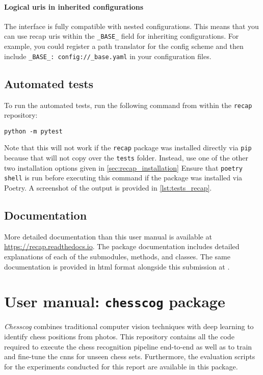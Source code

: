 \documentclass[../../report.tex]{subfiles}
\begin{document}
\subsubsection{Logical \acsp{uri} in inherited configurations}
The  interface is fully compatible with nested configurations.
This means that you can use recap \glspl{uri} within the \texttt{_BASE_} field for inheriting configurations.
For example, you could register a path translator for the config scheme and then include \texttt{_BASE_: config://_base.yaml} in your configuration files.

\section{Automated tests}
\label{sec:recap_tests}
To run the automated tests, run the following command from within the \texttt{recap} repository:
\begin{verbatim}
python -m pytest
\end{verbatim}
Note that this will not work if the \texttt{recap} package was installed directly via \texttt{pip} because that will not copy over the \texttt{tests} folder.
Instead, use one of the other two installation options given in \cref{sec:recap_installation}
Ensure that \texttt{poetry shell} is run before executing this command if the package was installed via Poetry.
A screenshot of the output is provided in \cref{lst:tests_recap}.

\section{Documentation}
\label{sec:recap_documentation}
More detailed documentation than this user manual is available at \url{https://recap.readthedocs.io}.
The package documentation includes detailed explanations of each of the submodules, methods, and classes.
The same documentation is provided in \gls{html} format alongside this submission at .

\chapter{User manual: \texttt{chesscog} package}
\label{chap:user_man_chesscog}

\emph{Chesscog} combines traditional computer vision techniques with deep learning to identify chess positions from photos.
This repository contains all the code required to execute the chess recognition pipeline end-to-end as well as to train and fine-tune the \glspl{cnn} for unseen chess sets.
Furthermore, the evaluation scripts for the experiments conducted for this report are available in this package.
\end{document}
